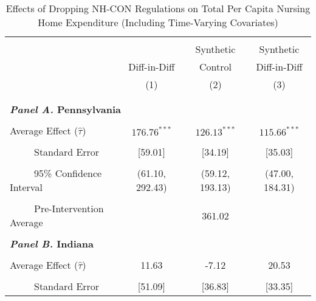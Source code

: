 \documentclass[12pt]{article}
\begin{document}
\vfill
\begin{table}[htbp]\centering \footnotesize
\def\sym#1{\ifmmode^{#1}\else\(^{#1}\)\fi}
\captionsetup{width=.78\textwidth}
\caption{\centering Effects of Dropping NH-CON Regulations on Total Per Capita Nursing Home Expenditure (Including Time-Varying Covariates)}
\label{tab:ave_results_tot_exp_nobord_con}
\setlength{\tabcolsep}{10pt}
\begin{tabular}{l*{3}{c}}
\hline\hline
\\[-2ex]
&\multicolumn{1}{c}{}&\multicolumn{1}{c}{Synthetic}&\multicolumn{1}{c}{Synthetic}\\
&\multicolumn{1}{c}{Diff-in-Diff}&\multicolumn{1}{c}{Control}&\multicolumn{1}{c}{Diff-in-Diff}\\
&\multicolumn{1}{c}{(1)}&\multicolumn{1}{c}{(2)}&\multicolumn{1}{c}{(3)}\\
\\[-2ex]
\hline
\\[-.1ex]
\multicolumn{4}{l}{\textbf{\textit{Panel A.} Pennsylvania}}\\
\\[-1.5ex]
\multicolumn{1}{l}{Average Effect ($\hat{\tau}$)}&   \multicolumn{1}{c}{$176.76^{***}$}&   \multicolumn{1}{c}{$126.13^{***}$}&  \multicolumn{1}{c}{$115.66^{***}$}\\
\\[-2ex]
\multicolumn{1}{l}{\ \ \ \ \ Standard Error}  &\multicolumn{1}{c}{[59.01]}&\multicolumn{1}{c}{[34.19]}&\multicolumn{1}{c}{[35.03]}\\
\\[-2ex]
\multicolumn{1}{l}{\ \ \ \ \ 95\% Confidence Interval}&   \multicolumn{1}{c}{(61.10, 292.43)}&   \multicolumn{1}{c}{(59.12, 193.13)}&   \multicolumn{1}{c}{(47.00, 184.31)}\\
\\[-2ex]
\multicolumn{1}{l}{\ \ \ \ \ Pre-Intervention Average}&   \multicolumn{3}{c}{361.02}\\
\\[-.1ex]
\multicolumn{4}{l}{\textbf{\textit{Panel B.} Indiana}}\\
\\[-1.5ex]
\multicolumn{1}{l}{Average Effect ($\hat{\tau}$)}&   \multicolumn{1}{c}{11.63}&   \multicolumn{1}{c}{-7.12}&  \multicolumn{1}{c}{20.53}\\
\\[-2ex]
\multicolumn{1}{l}{\ \ \ \ \ Standard Error}  &\multicolumn{1}{c}{[51.09]}&\multicolumn{1}{c}{[36.83]}&\multicolumn{1}{c}{[33.35]}\\

\end{tabular}
\end{table}
\end{document}
